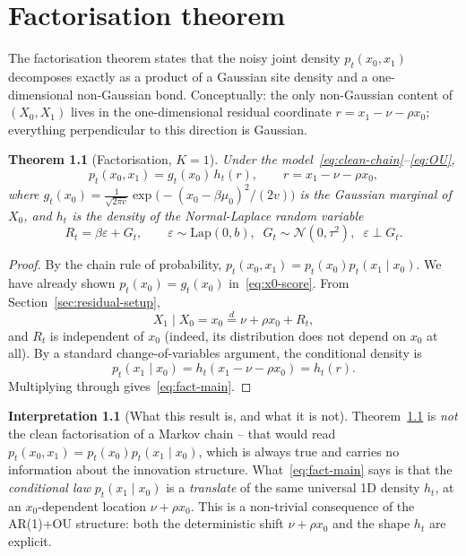 \documentclass[11pt,a4paper,openany]{book}
\theoremstyle{plainserif}
\newtheorem{theorem}{Theorem}[chapter]
\theoremstyle{definition}
\theoremstyle{remarkstyle}
\newtheorem*{interpretation}{Interpretation}
\newcommand{\Normal}{\mathcal{N}}
\newcommand{\Lap}{\mathrm{Lap}}
\begin{document}
\chapter{Factorisation theorem}
\label{ch:fact}

The factorisation theorem states that the noisy joint density $p_t(x_0,x_1)$
decomposes exactly as a product of a Gaussian site density and a
one-dimensional non-Gaussian bond. Conceptually: the only non-Gaussian
content of $(X_0, X_1)$ lives in the one-dimensional residual coordinate
$r = x_1 - \nu - \rho x_0$; everything perpendicular to this direction
is Gaussian.

\begin{theorem}[Factorisation, $K{=}1$]
\label{thm:fact}
Under the model~\eqref{eq:clean-chain}--\eqref{eq:OU},
\begin{equation}
p_t(x_0, x_1) = g_t(x_0)\, h_t(r),
\qquad
r = x_1 - \nu - \rho x_0,
\label{eq:fact-main}
\end{equation}
where $g_t(x_0) = \frac{1}{\sqrt{2\pi v}}\exp\!\bigl(-(x_0-\beta\mu_0)^2/(2v)\bigr)$
is the Gaussian marginal of $X_0$, and $h_t$ is the density of the
Normal-Laplace random variable
\begin{equation}
R_t = \beta\varepsilon + G_t,\qquad
\varepsilon \sim \Lap(0,b),\;\;
G_t \sim \Normal(0,\tau^2),\;\;
\varepsilon \perp G_t.
\label{eq:Rt}
\end{equation}
\end{theorem}

\begin{proof}
By the chain rule of probability, $p_t(x_0, x_1) = p_t(x_0) p_t(x_1\mid x_0)$.
We have already shown $p_t(x_0) = g_t(x_0)$ in~\eqref{eq:x0-score}. From
Section~\ref{sec:residual-setup},
\[
X_1 \mid X_0 = x_0 \stackrel{d}{=} \nu + \rho x_0 + R_t,
\]
and $R_t$ is independent of $x_0$ (indeed, its distribution does not
depend on $x_0$ at all). By a standard change-of-variables argument, the
conditional density is
\begin{equation}
p_t(x_1 \mid x_0) = h_t(x_1 - \nu - \rho x_0) = h_t(r).
\end{equation}
Multiplying through gives~\eqref{eq:fact-main}.
\end{proof}

\begin{interpretation}[What this result is, and what it is not]
Theorem~\ref{thm:fact} is \emph{not} the clean factorisation of a Markov
chain -- that would read $p_t(x_0,x_1) = p_t(x_0) p_t(x_1\mid x_0)$, which
is always true and carries no information about the innovation structure.
What~\eqref{eq:fact-main} says is that the \emph{conditional law}
$p_t(x_1 \mid x_0)$ is a \emph{translate} of the same universal 1D density
$h_t$, at an $x_0$-dependent location $\nu + \rho x_0$. This is a
non-trivial consequence of the AR(1)+OU structure: both the deterministic
shift $\nu + \rho x_0$ and the shape $h_t$ are explicit.
\end{interpretation}
\end{document}
